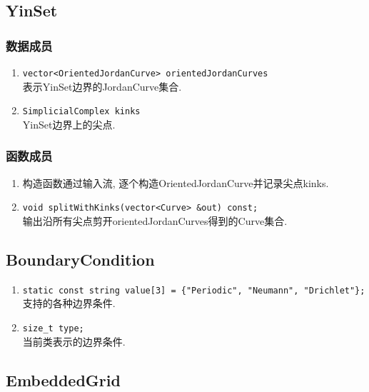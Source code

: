 \documentclass[a4paper]{book}
\numberwithin{equation}{chapter}
\theoremstyle{definition}
\begin{document}
\subsection{YinSet}

\subsubsection{数据成员}
\begin{enumerate}
  \item \texttt{vector<OrientedJordanCurve> orientedJordanCurves} \\
        表示YinSet边界的JordanCurve集合.

  \item \texttt{SimplicialComplex kinks} \\
        YinSet边界上的尖点.
\end{enumerate}

\subsubsection{函数成员}
\begin{enumerate}
  \item 构造函数通过输入流, 逐个构造OrientedJordanCurve并记录尖点kinks.

  \item \texttt{void splitWithKinks(vector<Curve> \&out) const;} \\
        输出沿所有尖点剪开orientedJordanCurves得到的Curve集合.
\end{enumerate}

\subsection{BoundaryCondition}
\begin{enumerate}
  \item \texttt{static const string value[3] =
          \{"Periodic", "Neumann", "Drichlet"\};}\\
        支持的各种边界条件.

  \item \texttt{size\_t type;} \\
        当前类表示的边界条件.
\end{enumerate}

\subsection{EmbeddedGrid}
\end{document}

